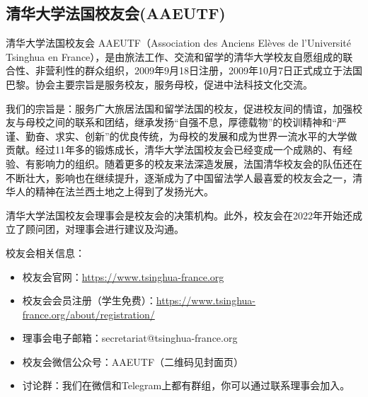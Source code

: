 \subsection{清华大学法国校友会(AAEUTF)}

清华大学法国校友会 AAEUTF（Association des Anciens Elèves de l’Université Tsinghua en France），是由旅法工作、交流和留学的清华大学校友自愿组成的联合性、非营利性的群众组织，2009年9月18日注册，2009年10月7日正式成立于法国巴黎。协会主要宗旨是服务校友，服务母校，促进中法科技文化交流。

我们的宗旨是：服务广大旅居法国和留学法国的校友，促进校友间的情谊，加强校友与母校之间的联系和团结，继承发扬“自强不息，厚德载物”的校训精神和“严谨、勤奋、求实、创新”的优良传统，为母校的发展和成为世界一流水平的大学做贡献。经过11年多的锻炼成长，清华大学法国校友会已经变成一个成熟的、有经验、有影响力的组织。随着更多的校友来法深造发展，法国清华校友会的队伍还在不断壮大，影响也在继续提升，逐渐成为了中国留法学人最喜爱的校友会之一，清华人的精神在法兰西土地之上得到了发扬光大。

清华大学法国校友会理事会是校友会的决策机构。此外，校友会在2022年开始还成立了顾问团，对理事会进行建议及沟通。

校友会相关信息：
\begin{itemize}
    \item 校友会官网：\href{https://www.tsinghua-france.org}{https://www.tsinghua-france.org}
    \item 校友会会员注册（学生免费）：\href{https://www.tsinghua-france.org/about/registration/}{https://www.tsinghua-france.org/about/registration/}
    \item 理事会电子邮箱：secretariat@tsinghua-france.org 
    \item 校友会微信公众号：AAEUTF（二维码见封面页）
    \item 讨论群：我们在微信和Telegram上都有群组，你可以通过联系理事会加入。
\end{itemize}
